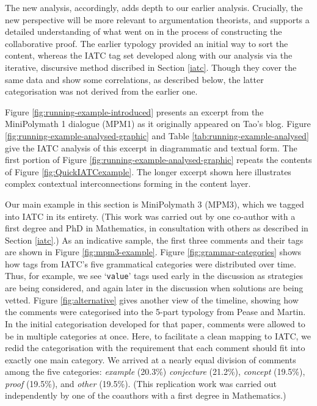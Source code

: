 \documentclass[smallextended,oneside]{svjour3}       %
\newcommand\nothing[1]{#1}
\let\paragraph\nothing
\begin{document}
The new analysis, accordingly, adds depth to our earlier analysis.
Crucially, the new perspective will be more relevant to argumentation
theorists, and supports a detailed understanding of what went on in
the process of constructing the collaborative proof.  The earlier
typology provided an initial way to sort the content, whereas the IATC
tag set developed along with our analysis via the iterative,
discursive method discribed in Section \ref{iatc}.  Though they cover
the same data and show some correlations, as described below,
the latter categorisation was not derived from the earlier one.

\paragraph{Figure \ref{fig:running-example-introduced} presents an excerpt from the MiniPolymath 1 dialogue (MPM1) as it originally appeared on Tao's blog.}
Figure \ref{fig:running-example-analysed-graphic} and Table
\ref{tab:running-example-analysed} give the IATC analysis of this
excerpt in diagrammatic and textual form.  The first portion of Figure
\ref{fig:running-example-analysed-graphic} repeats the contents of Figure
\ref{fig:QuickIATCexample}.  The longer excerpt shown here illustrates
complex contextual interconnections forming in the content
layer.

\paragraph{Our main example in this section is MiniPolymath 3 (MPM3),
which we tagged into IATC in its entirety.}
(This work was carried out by one co-author with a first degree and PhD in Mathematics,
in consultation with others as described in Section \ref{iatc}.)
As an indicative sample, the first three comments and their tags are shown in Figure
\ref{fig:mpm3-example}.
Figure \ref{fig:grammar-categories} shows how tags from IATC's five grammatical
categories were distributed over time.  Thus, for example, we see
`\texttt{value}' tags used early in the discussion as strategies are
being considered, and again later in the discussion when solutions are
being vetted.
Figure \ref{fig:alternative} gives another view of the timeline,
showing how the comments were categorised into the 5-part typology
from Pease and Martin.  In the initial
categorisation developed for that paper, comments were allowed to be
in multiple categories at once.
\paragraph{Here, to facilitate a clean mapping to IATC, we redid the categorisation with the requirement that each comment should fit into exactly one main category.}
We arrived at a nearly equal division of comments among the five categories:
\emph{example} (20.3\%) \emph{conjecture} (21.2\%),
\emph{concept} (19.5\%), \emph{proof} (19.5\%), and \emph{other}
(19.5\%).  (This replication work was carried out independently by
one of the coauthors with a first degree in Mathematics.)
\end{document}
